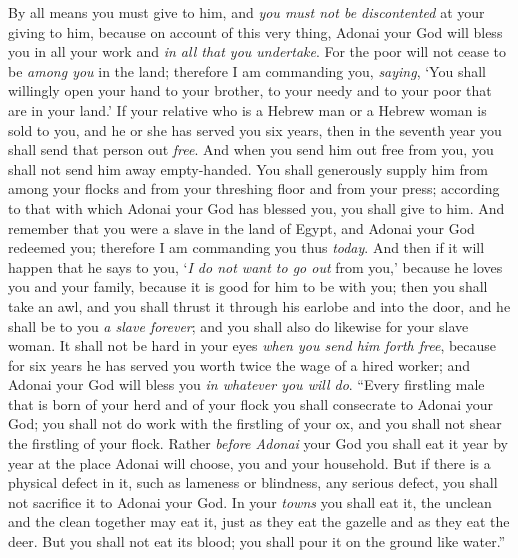 \begin{biblechapter}
\verse By all means you must give to him, and \textit{you must not be discontented} at your giving to him, because on account of this very thing, Adonai your God will bless you in all your work and \textit{in all that you undertake}.
\verse For the poor will not cease to be \textit{among you} in the land; therefore I am commanding you, \textit{saying}, ‘You shall willingly open your hand to your brother, to your needy and to your poor that are in your land.’
\verse If your relative who is a Hebrew man or a Hebrew woman is sold to you, and he or she has served you six years, then in the seventh year you shall send that person out \textit{free}.
\verse And when you send him out free from you, you shall not send him away empty-handed.
\verse You shall generously supply him from among your flocks and from your threshing floor and from your press; according to that with which Adonai your God has blessed you, you shall give to him.
\verse And remember that you were a slave in the land of Egypt, and Adonai your God redeemed you; therefore I am commanding you thus \textit{today}.
\verse And then if it will happen that he says to you, ‘\textit{I do not want to go out} from you,’ because he loves you and your family, because it is good for him to be with you;
\verse then you shall take an awl, and you shall thrust it through his earlobe and into the door, and he shall be to you \textit{a slave forever}; and you shall also do likewise for your slave woman.
\verse It shall not be hard in your eyes \textit{when you send him forth free}, because for six years he has served you worth twice the wage of a hired worker; and Adonai your God will bless you \textit{in whatever you will do}.
\verse “Every firstling male that is born of your herd and of your flock you shall consecrate to Adonai your God; you shall not do work with the firstling of your ox, and you shall not shear the firstling of your flock.
\verse Rather \textit{before Adonai} your God you shall eat it year by year at the place Adonai will choose, you and your household.
\verse But if there is a physical defect in it, such as lameness or blindness, any serious defect, you shall not sacrifice it to Adonai your God.
\verse In your \textit{towns} you shall eat it, the unclean and the clean together may eat it, just as they eat the gazelle and as they eat the deer.
\verse But you shall not eat its blood; you shall pour it on the ground like water.”
\end{biblechapter}

